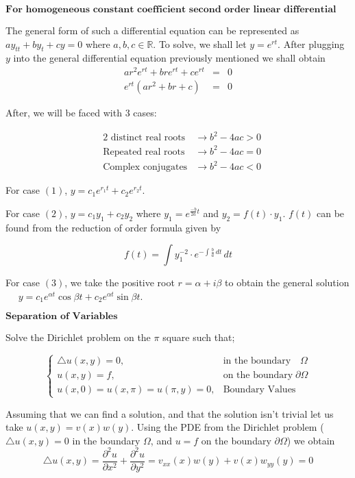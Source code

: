 \documentclass[12pt, a4paper]{article}
\theoremstyle{plain}
\theoremstyle{definition}
\theoremstyle{remark}
\newcommand{\RR}{\mathbb{R}}
\begin{document}
$$\textbf{For homogeneous constant coefficient second order linear differential equations}$$

The general form of such a differential equation can be represented as $ay_{tt}+by_{t}+cy=0$ where $a,b,c \in \RR$. To solve, we shall let $y=e^{rt}$. After plugging $y$ into the general differential equation previously mentioned we shall obtain 
\begin{eqnarray*}
ar^2e^{rt}+bre^{rt}+ce^{rt} &=& 0\\
e^{rt}(ar^2+br+c) &=& 0
\end{eqnarray*}

After, we will be faced with $3$ cases:

\begin{eqnarray}
&\text{2 distinct real roots}& \rightarrow b^2-4ac>0 \\
&\text{Repeated real roots}& \rightarrow b^2-4ac=0  \\
&\text{Complex conjugates}& \rightarrow b^2-4ac<0  
\end{eqnarray}

For case $(1)$, $y=c_1e^{r_1t}+c_2e^{r_2t}$.

For case $(2)$, $y= c_1y_1 +c_2y_2$ where $y_1=e^{\frac{-b}{2a}t}$ and $y_2=f(t)\cdot y_1$. $f(t)$ can be found from the reduction of order formula given by

$$f(t) = \int y^{-2}_1 \cdot e^{-\int \frac{b}{a}\,dt}\,dt $$

For case $(3)$, we take the positive root $r= \alpha + i \beta$ to obtain the general solution $\quad$ $y=c_1e^{\alpha t} \cos{\beta t} + c_2e^{\alpha t} \sin{\beta t}$.

\newpage

$\textbf{Separation of Variables}$


Solve the Dirichlet problem on the $\pi$ square such that;

\[
\begin{cases}
   \triangle u(x,y)=0, & \text{in the boundary} \quad \Omega\\
  u(x,y)=f, & \text{on the boundary} \; \partial \Omega\\
    u(x,0)=u(x,\pi)=u(\pi,y)=0,              & \text{Boundary Values}
\end{cases}
\]
 

Assuming that we can find a solution, and that the solution isn't trivial let us take $u(x,y)=v(x)w(y)$. Using the PDE from the Dirichlet problem ($\triangle u(x,y)=0$ in the boundary $\Omega$, and $u=f$ on the boundary $\partial \Omega$) we obtain 
$$ \triangle u(x,y) = \frac{\partial ^2u}{\partial x^2} + \frac{\partial ^2u}{\partial y^2} = v_{xx}(x)w(y)+v(x)w_{yy}(y) =0 $$
\end{document}
